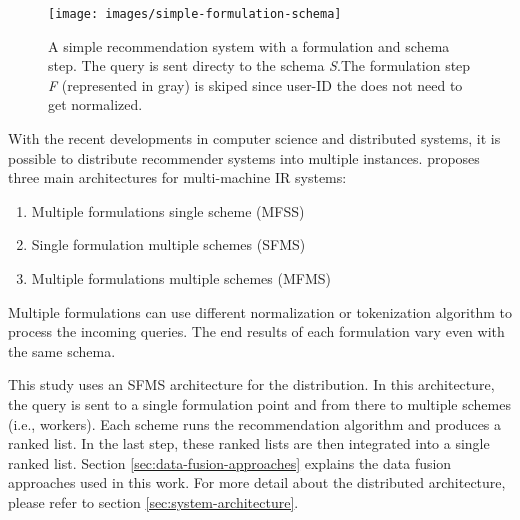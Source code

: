 \begin{figure}[!htb]
    \centering
    \texttt{[image: images/simple-formulation-schema]}
    \caption{A simple recommendation system with a formulation and schema step. The query is sent directy to the schema \emph{S}.The formulation step \emph{F} (represented in gray) is skiped since user-ID the does not need to get normalized.}
    \label{fig:data-fusion-simple}
\end{figure}


With the recent developments in computer science and distributed systems, it is possible to distribute recommender systems into multiple instances. \cite{frankhsuComparingRankScore2005} proposes three main architectures for multi-machine IR systems:

\begin{enumerate}
    \item Multiple formulations single scheme (MFSS)
    \item Single formulation multiple schemes (SFMS)
    \item Multiple formulations multiple schemes (MFMS)
\end{enumerate}


Multiple formulations can use different normalization or tokenization algorithm to process the incoming queries. The end results of each formulation vary even with the same schema.


This study uses an SFMS architecture for the distribution. In this architecture, the query is sent to a single formulation point and from there to multiple schemes (i.e., workers). Each scheme runs the recommendation algorithm and produces a ranked list. In the last step, these ranked lists are then integrated into a single ranked list. Section \ref{sec:data-fusion-approaches} explains the data fusion approaches used in this work. For more detail about the distributed architecture, please refer to section \ref{sec:system-architecture}.

